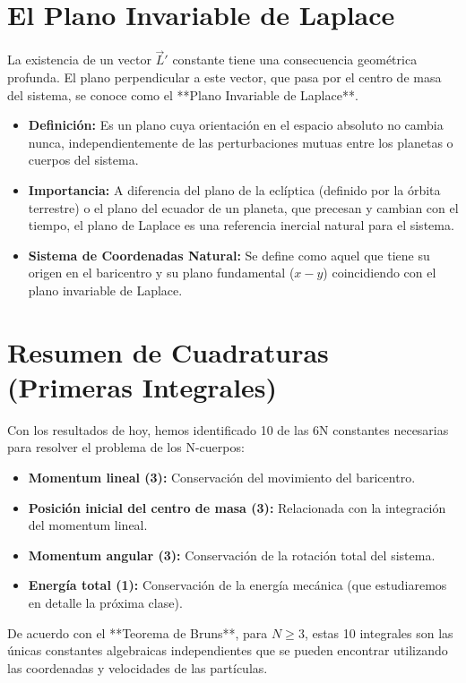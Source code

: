 \documentclass[a4paper]{article}
\begin{document}
\section{El Plano Invariable de Laplace}

La existencia de un vector $\vec{L}'$ constante tiene una consecuencia geométrica profunda. El plano perpendicular a este vector, que pasa por el centro de masa del sistema, se conoce como el **Plano Invariable de Laplace**.

\begin{itemize}
    \item \textbf{Definición:} Es un plano cuya orientación en el espacio absoluto no cambia nunca, independientemente de las perturbaciones mutuas entre los planetas o cuerpos del sistema.
    \item \textbf{Importancia:} A diferencia del plano de la eclíptica (definido por la órbita terrestre) o el plano del ecuador de un planeta, que precesan y cambian con el tiempo, el plano de Laplace es una referencia inercial natural para el sistema.
    \item \textbf{Sistema de Coordenadas Natural:} Se define como aquel que tiene su origen en el baricentro y su plano fundamental ($x-y$) coincidiendo con el plano invariable de Laplace.
\end{itemize}

\section{Resumen de Cuadraturas (Primeras Integrales)}

Con los resultados de hoy, hemos identificado 10 de las 6N constantes necesarias para resolver el problema de los N-cuerpos:
\begin{itemize}
    \item \textbf{Momentum lineal (3):} Conservación del movimiento del baricentro.
    \item \textbf{Posición inicial del centro de masa (3):} Relacionada con la integración del momentum lineal.
    \item \textbf{Momentum angular (3):} Conservación de la rotación total del sistema.
    \item \textbf{Energía total (1):} Conservación de la energía mecánica (que estudiaremos en detalle la próxima clase).
\end{itemize}

De acuerdo con el **Teorema de Bruns**, para $N \geq 3$, estas 10 integrales son las únicas constantes algebraicas independientes que se pueden encontrar utilizando las coordenadas y velocidades de las partículas.


 
\end{document}
